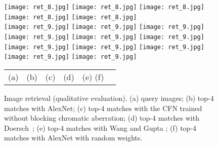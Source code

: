 \documentclass[runningheads]{llncs}
\begin{document}
\begin{figure}[t!]
\begin{center}
\texttt{[image: ret\_8.jpg]}
\texttt{[image: ret\_8.jpg]}\hspace{-1mm}
\texttt{[image: ret\_8.jpg]}
\texttt{[image: ret\_8.jpg]}\hspace{-1mm}
\texttt{[image: ret\_8.jpg]}
\\
\texttt{[image: ret\_9.jpg]}
\texttt{[image: ret\_9.jpg]}\hspace{-1mm}
\texttt{[image: ret\_9.jpg]}
\texttt{[image: ret\_9.jpg]}\hspace{-1mm}
\texttt{[image: ret\_9.jpg]}
\texttt{[image: ret\_9.jpg]}\hspace{-1mm}
\texttt{[image: ret\_9.jpg]}
\texttt{[image: ret\_9.jpg]}\hspace{-1mm}
\texttt{[image: ret\_9.jpg]}
\texttt{[image: ret\_9.jpg]}\hspace{-1mm}
\texttt{[image: ret\_9.jpg]}
\\
\begin{tabular}{cccccc}
(a)&\hspace{9mm}(b)&\hspace{19mm}(c)&\hspace{18mm}(d)&\hspace{18mm}(e)
\hspace{18mm}(f)&\hspace{10mm}
\end{tabular}
 \caption{Image retrieval (qualitative evaluation). (a) query images; (b) top-4 matches with AlexNet; (c) top-4 matches with the CFN  trained without blocking chromatic aberration; (d) top-4 matches with Doersch~\etal \cite{Carl2015}; (e) top-4 matches with Wang and Gupta \cite{Gupta15}; (f) top-4 matches with AlexNet with random weights.} \label{fig:retrievalquali}
\end{center}
\end{figure}
\end{document}
